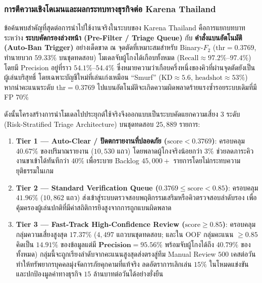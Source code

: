 \subsubsection{การตีความเชิงโดเมนและผลกระทบทางธุรกิจต่อ Karena Thailand}

ข้อค้นพบสำคัญที่สุดต่อการนำไปใช้งานจริงในระบบของ Karena Thailand คือการแยกบทบาทระหว่าง \textbf{ระบบคัดกรองล่วงหน้า (Pre-Filter / Triage Queue)} กับ \textbf{คำสั่งแบนอัตโนมัติ (Auto-Ban Trigger)} อย่างเด็ดขาด ณ จุดตัดที่เหมาะสมสำหรับ Binary-$F_2$ ($\text{thr} = 0.3769$, ทำนายบวก $59.33\%$ บนชุดทดสอบ) โมเดลจับผู้โกงได้เกือบทั้งหมด ($\text{Recall} \approx 97.2\%$--$97.4\%$) โดยมี Precision อยู่ที่ราว $54.1\%$--$54.4\%$ ซึ่งหมายความว่าเกือบครึ่งหนึ่งของคิวที่ผ่านจุดตัดยังเป็นผู้เล่นบริสุทธิ์ โดยเฉพาะบัญชีใหม่ที่เล่นเก่งเหมือน ``Smurf'' ($\text{KD} \approx 5.6$, $\text{headshot} \approx 53\%$) หากนำคะแนนระดับ $\text{thr} = 0.3769$ ไปแบนอัตโนมัติจะเกิดความผิดพลาดร้ายแรงซ้ำรอยระบบเดิมที่มี FP $70\%$

ดังนั้นโครงสร้างการนำโมเดลไปประยุกต์ใช้จริงจึงออกแบบเป็นระบบคัดแยกความเสี่ยง $3$ ระดับ (Risk-Stratified Triage Architecture) บนชุดทดสอบ $25,889$ รายการ:
\begin{enumerate}
  \item \textbf{Tier 1 --- Auto-Clear / ปัดตกรายงานที่ปลอดภัย ($\text{score} < 0.3769$)}: ครอบคลุม $40.67\%$ ของปริมาณรายงาน ($10,530$ แถว) โดยพลาดผู้โกงจริงน้อยกว่า $3\%$ ช่วยลดภาระคิวงานขาเข้าได้ทันทีกว่า $40\%$ เพื่อระบาย Backlog $45,000+$ รายการโดยไม่กระทบความยุติธรรมในเกม
  \item \textbf{Tier 2 --- Standard Verification Queue ($0.3769 \le \text{score} < 0.85$)}: ครอบคลุม $41.96\%$ ($10,862$ แถว) ส่งเข้าสู่ระบบตรวจสอบพฤติกรรมเสริมหรือคิวตรวจสอบลำดับรอง เพื่อคุ้มครองผู้เล่นปกติที่มีค่าสถิติการยิงสูงจากการถูกแบนผิดพลาด
  \item \textbf{Tier 3 --- Fast-Track High-Confidence Review ($\text{score} \ge 0.85$)}: ครอบคลุมกลุ่มความเสี่ยงสูงสุด $17.37\%$ ($4,497$ แถวบนชุดทดสอบ; และใน OOF กลุ่มคะแนน $\ge 0.85$ คิดเป็น $14.91\%$ ของข้อมูลแต่มี $\mathbf{Precision = 95.56\%}$ พร้อมจับผู้โกงได้ถึง $40.79\%$ ของทั้งหมด) กลุ่มนี้จะถูกเรียงลำดับจากคะแนนสูงสุดส่งตรงสู่ทีม Manual Review $500$ เคสต่อวัน ทำให้ทรัพยากรบุคคลมุ่งจัดการภัยคุกคามที่แท้จริง ลดอัตราการเลิกเล่น $15\%$ ในโหมดแข่งขัน และปกป้องมูลค่าทางธุรกิจ $15$ ล้านบาทต่อวันได้อย่างยั่งยืน
\end{enumerate}
